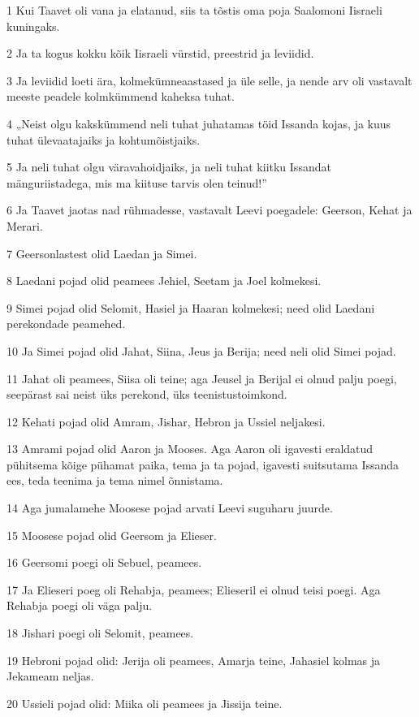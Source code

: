 \par 1 Kui Taavet oli vana ja elatanud, siis ta tõstis oma poja Saalomoni Iisraeli kuningaks.
\par 2 Ja ta kogus kokku kõik Iisraeli vürstid, preestrid ja leviidid.
\par 3 Ja leviidid loeti ära, kolmekümneaastased ja üle selle, ja nende arv oli vastavalt meeste peadele kolmkümmend kaheksa tuhat.
\par 4 „Neist olgu kakskümmend neli tuhat juhatamas töid Issanda kojas, ja kuus tuhat ülevaatajaiks ja kohtumõistjaiks.
\par 5 Ja neli tuhat olgu väravahoidjaiks, ja neli tuhat kiitku Issandat mänguriistadega, mis ma kiituse tarvis olen teinud!”
\par 6 Ja Taavet jaotas nad rühmadesse, vastavalt Leevi poegadele: Geerson, Kehat ja Merari.
\par 7 Geersonlastest olid Laedan ja Simei.
\par 8 Laedani pojad olid peamees Jehiel, Seetam ja Joel kolmekesi.
\par 9 Simei pojad olid Selomit, Hasiel ja Haaran kolmekesi; need olid Laedani perekondade peamehed.
\par 10 Ja Simei pojad olid Jahat, Siina, Jeus ja Berija; need neli olid Simei pojad.
\par 11 Jahat oli peamees, Siisa oli teine; aga Jeusel ja Berijal ei olnud palju poegi, seepärast sai neist üks perekond, üks teenistustoimkond.
\par 12 Kehati pojad olid Amram, Jishar, Hebron ja Ussiel neljakesi.
\par 13 Amrami pojad olid Aaron ja Mooses. Aga Aaron oli igavesti eraldatud pühitsema kõige pühamat paika, tema ja ta pojad, igavesti suitsutama Issanda ees, teda teenima ja tema nimel õnnistama.
\par 14 Aga jumalamehe Moosese pojad arvati Leevi suguharu juurde.
\par 15 Moosese pojad olid Geersom ja Elieser.
\par 16 Geersomi poegi oli Sebuel, peamees.
\par 17 Ja Elieseri poeg oli Rehabja, peamees; Elieseril ei olnud teisi poegi. Aga Rehabja poegi oli väga palju.
\par 18 Jishari poegi oli Selomit, peamees.
\par 19 Hebroni pojad olid: Jerija oli peamees, Amarja teine, Jahasiel kolmas ja Jekameam neljas.
\par 20 Ussieli pojad olid: Miika oli peamees ja Jissija teine.
